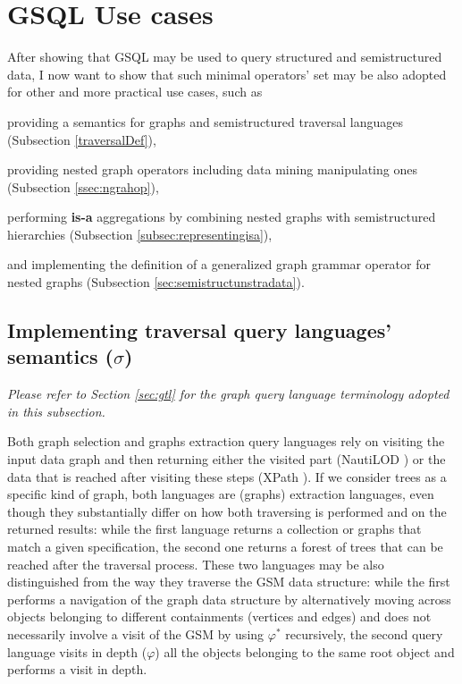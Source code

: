 

\section{GSQL Use cases}\label{ssec:travgraphop}
After showing that GSQL may be used to query structured and semistructured data, I now want to show that such minimal operators' set may be also adopted for other and more practical use cases, such as \begin{mylist}
	\item providing a semantics for graphs and semistructured traversal languages (Subsection \vref{traversalDef}),
	\item providing nested graph operators including data mining manipulating ones (Subsection \vref{ssec:ngrahop}),
	\item performing \textbf{is-a} aggregations by combining nested graphs with semistructured hierarchies (Subsection \vref{subsec:representingisa}),
	\item and implementing the definition of a generalized graph grammar operator for nested graphs (Subsection \vref{sec:semistructunstradata}).
\end{mylist}

\subsection{Implementing traversal query languages' semantics ($\sigma$)}\label{traversalDef}
\textit{Please refer to Section \vref{sec:gtl} for the graph query language terminology adopted in this subsection.}
\bigskip

Both graph selection and graphs extraction query languages rely on visiting the input data graph and then returning either the visited part (NautiLOD \cite{NautiLOD}) or the data that is reached after visiting these steps (XPath \cite{xpath31}). If we consider trees as a specific kind of graph, both languages are (graphs) extraction languages, even though they substantially differ on how both traversing is performed and on the returned results: while the first language returns a collection or graphs that match a given specification, the second one returns a forest of trees that can be reached after the traversal process. These two languages may be also distinguished from the way they traverse the GSM data structure: while the first performs a navigation of the graph data structure by alternatively moving across objects belonging to different containments (vertices and edges) and does not necessarily involve a visit of the GSM by using $\varphi^*$ recursively, the second query language visits in depth ($\varphi$) all the objects belonging to the same root object and performs a visit in depth.

